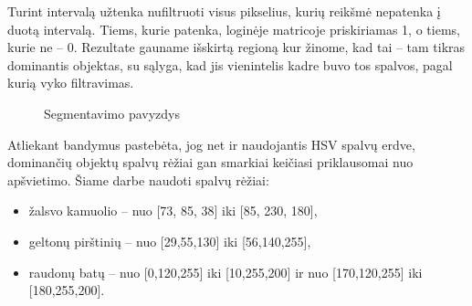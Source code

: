 \documentclass{VUMIFPSbakalaurinis}
\begin{document}
Turint intervalą užtenka nufiltruoti visus pikselius, kurių reikšmė nepatenka į duotą intervalą. Tiems, kurie patenka, loginėje matricoje priskiriamas 1, o tiems, kurie ne – 0. Rezultate gauname išskirtą regioną kur žinome, kad tai – tam tikras dominantis objektas, su sąlyga, kad jis vienintelis kadre buvo tos spalvos, pagal kurią vyko filtravimas. 
\begin{figure}[H]
	\centering
	\qquad
	\caption{Segmentavimo pavyzdys}
	\label{fig:example}
\end{figure}

Atliekant bandymus pastebėta, jog net ir naudojantis HSV spalvų erdve, dominančių objektų spalvų rėžiai gan smarkiai keičiasi priklausomai nuo apšvietimo. Šiame darbe naudoti spalvų rėžiai:

\begin{itemize} 
	\item žalsvo kamuolio – nuo [73, 85, 38] iki [85, 230, 180],
	\item geltonų pirštinių – nuo [29,55,130] iki [56,140,255],
	\item raudonų batų – nuo [0,120,255] iki [10,255,200] ir nuo [170,120,255] iki [180,255,200].
\end{itemize}
\end{document}

